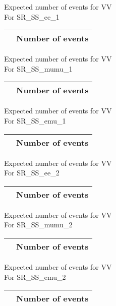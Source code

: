 \begin{frame}{Expected number of events for VV \\ For SR\_SS\_ee\_1}
\vspace{5mm}
\begin{tabular}{|c|c|}
\hline
& Number of events \\
\hline

\end{tabular}
\end{frame}

\begin{frame}{Expected number of events for VV \\ For SR\_SS\_mumu\_1}
\vspace{5mm}
\begin{tabular}{|c|c|}
\hline
& Number of events \\
\hline

\end{tabular}
\end{frame}

\begin{frame}{Expected number of events for VV \\ For SR\_SS\_emu\_1}
\vspace{5mm}
\begin{tabular}{|c|c|}
\hline
& Number of events \\
\hline

\end{tabular}
\end{frame}

\begin{frame}{Expected number of events for VV \\ For SR\_SS\_ee\_2}
\vspace{5mm}
\begin{tabular}{|c|c|}
\hline
& Number of events \\
\hline

\end{tabular}
\end{frame}

\begin{frame}{Expected number of events for VV \\ For SR\_SS\_mumu\_2}
\vspace{5mm}
\begin{tabular}{|c|c|}
\hline
& Number of events \\
\hline

\end{tabular}
\end{frame}

\begin{frame}{Expected number of events for VV \\ For SR\_SS\_emu\_2}
\vspace{5mm}
\begin{tabular}{|c|c|}
\hline
& Number of events \\
\hline

\end{tabular}
\end{frame}

